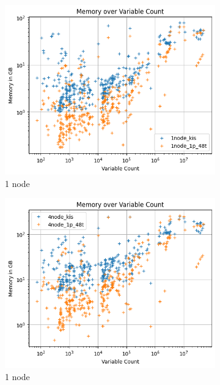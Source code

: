 \documentclass[12pt,a4paper,twoside]{scrartcl}
\numberwithin{equation}{section}
\begin{document}
\begin{figure}
  \center
  \begin{subfigure}[c]{.4\textwidth}
    \center
    \includegraphics[scale=.3]{plots/1node_compare/mem_abs_over_vars.png}
    \caption{1 node}
  \end{subfigure}
  \begin{subfigure}[c]{.4\textwidth}
    \center
    \includegraphics[scale=.3]{plots/4node_compare/mem_abs_over_vars.png}
    \caption{1 node}
  \end{subfigure}
  \begin{subfigure}[c]{.4\textwidth}

\end{subfigure}
\end{figure}
\end{document}
